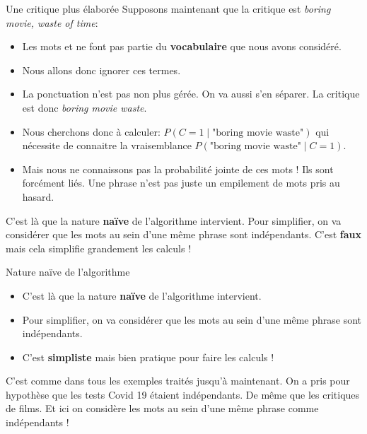 \begin{frame}{Une critique plus élaborée}
	Supposons maintenant que la critique est \textit{boring movie, waste of time}:
	\begin{itemize}
		\item Les mots  et  ne font pas partie du \textbf{vocabulaire} que nous avons considéré.
		\pause
		\item Nous allons donc ignorer ces termes.
		\pause
		\item La ponctuation n'est pas non plus gérée. On va aussi s'en séparer. La critique est donc \textit{boring movie waste}.
		\pause
		\item Nous cherchons donc à calculer: $P(C = 1 \mid \text{"boring movie waste"})$ qui nécessite de connaitre la vraisemblance $P(\text{"boring movie waste"} \mid C = 1)$.
		\pause
		\item Mais nous ne connaissons pas la probabilité jointe de ces mots ! Ils sont forcément liés. Une phrase n'est pas juste un empilement de mots pris au hasard.
	\end{itemize}
	\pause
	C'est là que la nature \textbf{naïve} de l'algorithme intervient. Pour simplifier, on va considérer que les mots au sein d'une même phrase sont indépendants. C'est \textbf{faux} mais cela simplifie grandement les calculs !
\end{frame}

\begin{frame}{Nature naïve de l'algorithme}
	\begin{itemize}
		\item C'est là que la nature \textbf{naïve} de l'algorithme intervient.
		\pause
		\item Pour simplifier, on va considérer que les mots au sein d'une même phrase sont indépendants.
		\pause
		\item C'est \textbf{simpliste} mais bien pratique pour faire les calculs !
	\end{itemize}
	\pause
	\vspace{0.5cm}
	C'est comme dans tous les exemples traités jusqu'à maintenant. On a pris pour hypothèse que les tests Covid 19 étaient indépendants. De même que les critiques de films. Et ici on considère les mots au sein d'une même phrase comme indépendants !
\end{frame}

